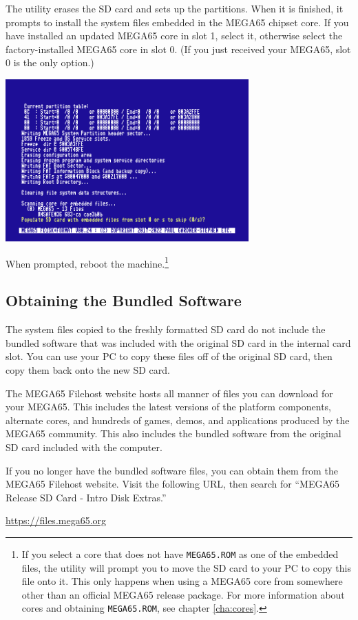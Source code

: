 The utility erases the SD card and sets up the partitions. When it is finished, it prompts to install the system files embedded in the MEGA65 chipset core. If you have installed an updated MEGA65 core in slot 1, select it, otherwise select the factory-installed MEGA65 core in slot 0. (If you just received your MEGA65, slot 0 is the only option.)

\begin{center}
  \includegraphics[width=0.7\textwidth]{images/ss-m65fdisk-populate.png}
\end{center}

When prompted, reboot the machine.\footnote{If you select a core that does not have {\tt MEGA65.ROM} as one of the embedded files, the utility will prompt you to move the SD card to your PC to copy this file onto it. This only happens when using a MEGA65 core from somewhere other than an official MEGA65 release package. For more information about cores and obtaining {\tt MEGA65.ROM}, see chapter \vref{cha:cores}.}

\subsection{Obtaining the Bundled Software}

The system files copied to the freshly formatted SD card do not include the bundled software that was included with the original SD card in the internal card slot. You can use your PC to copy these files off of the original SD card, then copy them back onto the new SD card.

The MEGA65 Filehost website hosts all manner of files you can download for your MEGA65. This includes the latest versions of the platform components, alternate cores, and hundreds of games, demos, and applications produced by the MEGA65 community. This also includes the bundled software from the original SD card included with the computer.

If you no longer have the bundled software files, you can obtain them from the MEGA65 Filehost website. Visit the following URL, then search for ``MEGA65 Release SD Card - Intro Disk Extras.''

\url{https://files.mega65.org}
